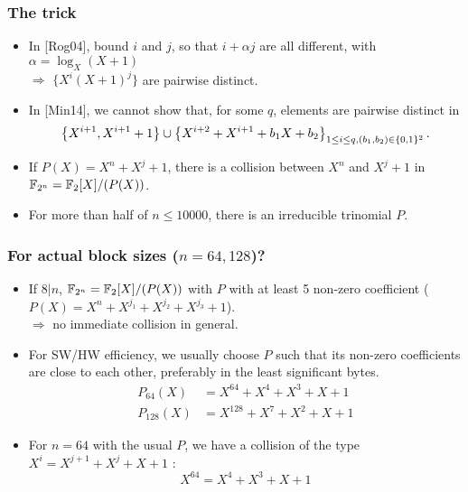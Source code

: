 \documentclass{beamer}
\begin{document}
	\begin{frame}
		\frametitle{The trick}

		\begin{itemize}
			\item In [Rog04], bound $i$ and $j$, so that $i + \alpha j$ are all different, with $\alpha = \log_X (X+1)$  
			\\ \tab $\Rightarrow$ $\{X^i (X+1)^j\}$ are pairwise distinct.
			
			\item<2-> In [Min14], we cannot show that, for some $q$, elements are pairwise distinct in 
				\[
				\left\{X^{i+1}, X^{i+1} +1 \right\} \cup \left\{ X^{i+2} + X^{i+1} + b_1 X + b_2\right\}_{1\leq i \leq q, (b_1,b_2) \in \{0, 1\}^2}.
				\]
		
			\item<3-> If $P(X) = X^n + X^j + 1$, there is a collision between $X^n$ and $X^j + 1$ in $\mathbb{F}_{2^n} = \mathbb{F}_2[X]/(P(X))$.
			
			\item<4-> For more than half of $n \leq 10 000$, there is an irreducible trinomial $P$.
		\end{itemize}
	\end{frame}

	\begin{frame}
		\frametitle{For actual block sizes ($n = 64, 128$)?}

		\begin{itemize}
			\item If $8 | n$, $\mathbb{F}_{2^n} = \mathbb{F}_2[X]/(P(X))$ with $P$ with at least 5 non-zero coefficient ($P(X) = X^n + X^{j_1} + X^{j_2} + X^{j_3} +1$).
			\\ \tab $\Rightarrow$ no immediate collision in general.
			
			\item<2-> For SW/HW efficiency, we usually choose $P$ such that its non-zero coefficients are close to each other, preferably in the least significant bytes.
			\begin{align*}
				P_{64}(X) &= X^{64}+X^4+X^3+X+1 \\
				P_{128}(X) &= X^{128}+X^{7}+X^{2}+X+1
			\end{align*}
			
			\item<3-> For $n = 64$ with the usual $P$, we have a collision of the type $X^i = X^{j+1} + X^j + X + 1$ :
			 \[
			 X^{64} = X^4+X^3+X+1
			 \]
		\end{itemize}
		
	\end{frame}
\end{document}
